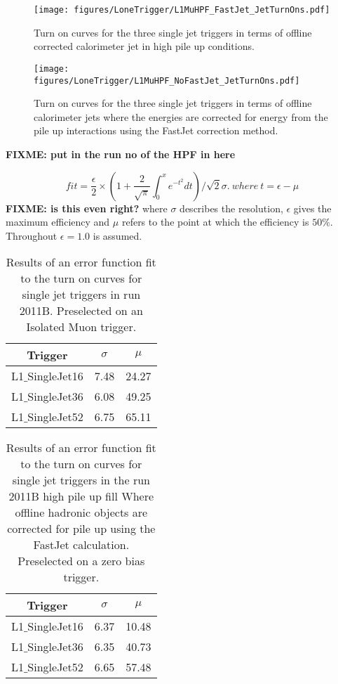 \begin{figure}[ht]
  \centering
    \texttt{[image: figures/LoneTrigger/L1MuHPF\_FastJet\_JetTurnOns.pdf]}
  \caption{Turn on curves for the three \Lone single jet triggers in terms of 
  offline corrected \AK calorimeter jet \ET in high pile up conditions.}
  \label{fig:figures_LoneTrigger_L1MuHPF_FastJet_JetTurnOns}
\end{figure}


\begin{figure}[ht]
  \centering
    \texttt{[image: figures/LoneTrigger/L1MuHPF\_NoFastJet\_JetTurnOns.pdf]}
  \caption{Turn on curves for the three \Lone single jet triggers in terms of 
  offline \AK calorimeter jets where the energies are corrected for energy from 
  the pile up interactions using the FastJet correction method.}
  \label{fig:figures_LoneTrigger_L1MuHPF_NoFastJet_JetTurnOns}
\end{figure}

\textbf{FIXME: put in the run no of the HPF in here} 


\begin{equation}
    fit = \frac{\epsilon}{2} \times (1 + 
    \frac{2}{\sqrt{\pi}}\int^{x}_{0}e^{-t^{2}}dt)/\sqrt{2}\sigma. ~ where~ t = 
    \epsilon - \mu
\label{eqn:erf}
\end{equation}
\textbf{FIXME: is this even right?}
where $\sigma$ describes the resolution, $\epsilon$ gives the maximum 
efficiency and $\mu$ refers to the point at which the efficiency is $50\%$.
Throughout $\epsilon = 1.0 $ is assumed. 
\begin{table}[ht]
\begin{tabular}{|c|c|c|}
\hline
Trigger & $\sigma$ & $\mu$\\
\hline
L1$\_$SingleJet16 & 7.48 & 24.27 \\
\hline
L1$\_$SingleJet36 & 6.08 & 49.25 \\
\hline
L1$\_$SingleJet52 & 6.75 & 65.11 \\
\hline
\end{tabular}
\caption{Results of an error function fit to the turn on curves for \Lone 
single jet triggers in run 2011B. Preselected on an Isolated Muon trigger.}
\label{tab:2011B_performance}
\end{table}


\begin{table}[ht]
\begin{tabular}{|c|c|c|}
\hline
Trigger & $\sigma$ & $\mu$\\
\hline
L1$\_$SingleJet16 & 6.37 & 10.48 \\
\hline
L1$\_$SingleJet36 & 6.35 & 40.73 \\
\hline
L1$\_$SingleJet52 & 6.65 & 57.48 \\
\hline
\end{tabular}
\caption{Results of an error function fit to the turn on curves for \Lone 
single jet triggers in the run 2011B high pile up fill Where offline hadronic 
objects are corrected for pile up using the FastJet calculation. Preselected on 
a zero bias trigger.}
\label{tab:2011B_HighPU_FastJet}
\end{table}


